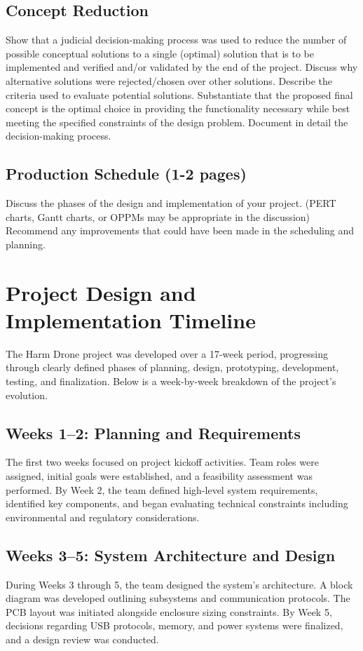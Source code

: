 \documentclass[12pt]{article}
\begin{document}
\subsection{Concept Reduction}
Show that a judicial decision-making process was used to reduce the number of possible conceptual solutions to a single (optimal) solution that is to be implemented and verified and/or validated by the end of the project. Discuss why alternative solutions were rejected/chosen over other solutions. Describe the criteria used to evaluate potential solutions. Substantiate that the proposed final concept is the optimal choice in providing the functionality necessary while best meeting the specified constraints of the design problem. Document in detail the decision-making process.

\subsection{Production Schedule (1-2 pages)}
Discuss the phases of the design and implementation of your project. (PERT charts, Gantt charts, or OPPMs may be appropriate in the discussion) Recommend any improvements that could have been made in the scheduling and planning.

\section{Project Design and Implementation Timeline}

The Harm Drone project was developed over a 17-week period, progressing through clearly defined phases of planning, design, prototyping, development, testing, and finalization. Below is a week-by-week breakdown of the project's evolution.

\subsection*{Weeks 1–2: Planning and Requirements}
The first two weeks focused on project kickoff activities. Team roles were assigned, initial goals were established, and a feasibility assessment was performed. By Week 2, the team defined high-level system requirements, identified key components, and began evaluating technical constraints including environmental and regulatory considerations.

\subsection*{Weeks 3–5: System Architecture and Design}
During Weeks 3 through 5, the team designed the system's architecture. A block diagram was developed outlining subsystems and communication protocols. The PCB layout was initiated alongside enclosure sizing constraints. By Week 5, decisions regarding USB protocols, memory, and power systems were finalized, and a design review was conducted.
\end{document}
